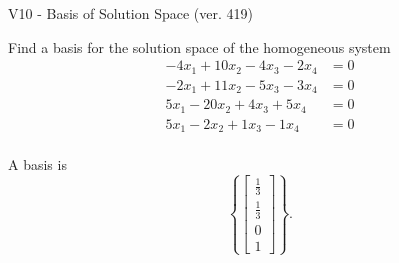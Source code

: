 \begin{exercise}
  \begin{exerciseTitle}V10 - Basis of Solution Space (ver. 419)\end{exerciseTitle}
  \begin{exerciseStatement}
    Find a basis for the solution space of the homogeneous system 
\begin{align*}
 -4 x_ 1 + 10 x_ 2 -4 x_ 3 -2 x_ 4 &= 0  \\ 
  -2 x_ 1 + 11 x_ 2 -5 x_ 3 -3 x_ 4 &= 0  \\ 
  5 x_ 1 -20 x_ 2 + 4 x_ 3 + 5 x_ 4 &= 0  \\ 
  5 x_ 1 -2 x_ 2 + 1 x_ 3 -1 x_ 4 &= 0  \\ 
 \end{align*}


 
  \end{exerciseStatement}

  \begin{exerciseAnswer}
   A basis is   
\[\left\{\left[\begin{array}{c}
\frac{1}{3} \\
\frac{1}{3} \\
0 \\
1
\end{array}\right]\right\}.\]

  


  \end{exerciseAnswer}
\end{exercise}